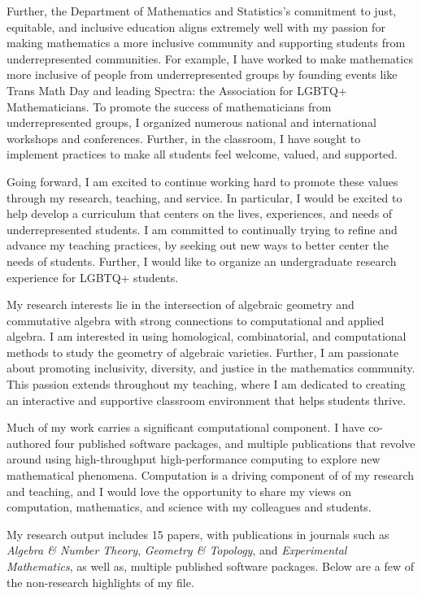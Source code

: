 \documentclass[11pt]{article}
\begin{document}
Further, the Department of Mathematics and Statistics's commitment to just, equitable, and inclusive education aligns extremely well with my passion for making mathematics a more inclusive community and supporting students from underrepresented communities. For example, I have worked to make mathematics more inclusive of people from underrepresented groups by founding events like Trans Math Day and leading Spectra: the Association for LGBTQ+ Mathematicians. To promote the success of mathematicians from underrepresented groups, I organized numerous national and international workshops and conferences. Further, in the classroom, I have sought to implement practices to make all students feel welcome, valued, and supported. 

Going forward, I am excited to continue working hard to promote these values through my research, teaching, and service. In particular, I would be excited to help develop a curriculum that centers on the lives, experiences, and needs of underrepresented students. I am committed to continually trying to refine and advance my teaching practices, by seeking out new ways to better center the needs of students. Further, I would like to organize an undergraduate research experience for LGBTQ+ students.

My research interests lie in the intersection of algebraic geometry and commutative algebra with strong connections to computational and applied algebra. I am interested in using homological, combinatorial, and computational methods to study the geometry of algebraic varieties. Further, I am passionate about promoting inclusivity, diversity, and justice in the mathematics community. This passion extends throughout my teaching, where I am dedicated to creating an interactive and supportive classroom environment that helps students thrive.

Much of my work carries a significant computational component. I have co-authored four published software packages, and multiple publications that revolve around using high-throughput high-performance computing to explore new mathematical phenomena. Computation is a driving component of of my research and teaching, and I would love the opportunity to share my views on computation, mathematics, and science with my colleagues and students. 

My research output includes 15 papers, with publications in journals such as \textit{Algebra \& Number Theory}, \textit{Geometry \& Topology}, and \textit{Experimental Mathematics}, as well as, multiple published software packages. Below are a few of the non-research highlights of my file.
\end{document}
